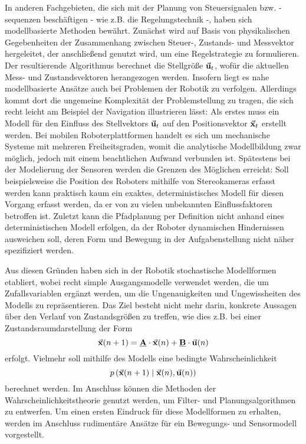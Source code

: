 In anderen Fachgebieten, die sich mit der Planung von Steuersignalen bzw. -sequenzen beschäftigen - wie z.B. die Regelungstechnik -, haben sich modellbasierte Methoden bewährt. Zunächst wird auf Basis von physikalischen Gegebenheiten der Zusammenhang zwischen Steuer-, Zustands- und Messvektor hergeleitet, der anschließend genutzt wird, um eine Regelstrategie zu formulieren. Der resultierende Algorithmus berechnet die Stellgröße $\vec{\mathbf{u}}_t$, wofür die aktuellen Mess- und Zustandsvektoren herangezogen werden. Insofern liegt es nahe modellbasierte Ansätze auch bei Problemen der Robotik zu verfolgen. Allerdings kommt dort die ungemeine Komplexität der Problemstellung zu tragen, die sich recht leicht am Beispiel der Navigation illustrieren lässt: Als erstes muss ein Modell für den Einfluss des Stellvektors $\vec{\mathbf{u}}_t$ auf den Positionsvektor $\vec{\mathbf{x}}_t$ erstellt werden. Bei mobilen Roboterplattformen handelt es sich um mechanische Systeme mit mehreren Freiheitsgraden, womit die analytische Modellbildung zwar möglich, jedoch mit einem beachtlichen Aufwand verbunden ist. Spätestens bei der Modelierung der Sensoren werden die Grenzen des Möglichen erreicht: Soll beispielsweise die Position des Roboters mithilfe von Stereokameras erfasst werden kann praktisch kaum ein exaktes, deterministisches Modell für diesen Vorgang erfasst werden, da er von zu vielen unbekannten Einflussfaktoren betroffen ist. Zuletzt kann die Pfadplanung per Definition nicht anhand eines deterministischen Modell erfolgen, da der Roboter dynamischen Hindernissen ausweichen soll, deren Form und Bewegung in der Aufgabenstellung nicht näher spezifiziert werden.

Aus diesen Gründen haben sich in der Robotik stochastische Modellformen etabliert, wobei recht simple Ausgangsmodelle verwendet werden, die um Zufallsvariablen ergänzt werden, um die Ungenauigkeiten und Ungewissheiten des Modells zu repräsentieren. Das Ziel besteht nicht mehr darin, konkrete Aussagen über den Verlauf von Zustandsgrößen zu treffen, wie dies z.B. bei einer Zustandsraumdarstellung der Form
\begin{equation}
\vec{\mathbf{x}}(n+1) = \mathbf{\underline{{{A}}}}\cdot \vec{\mathbf{x}}(n) + \mathbf{\underline{{B}}}\cdot \vec{\mathbf{\mathbf{u}}}(n)
\end{equation}
erfolgt. Vielmehr soll mithilfe des Modells eine bedingte Wahrscheinlichkeit
\begin{equation}
p\left({\vec{\mathbf{x}}(n+1)} \hspace{1mm} \vert \hspace{1mm} {\vec{\mathbf{x}}(n), \vec{\mathbf{u}}(n)}\right)
\end{equation}
berechnet werden. Im Anschluss können die Methoden der Wahrscheinlichkeitstheorie genutzt werden, um Filter- und Planungsalgorithmen zu entwerfen. Um einen ersten Eindruck für diese Modellformen zu erhalten, werden im Anschluss rudimentäre Ansätze für ein Bewegungs- und Sensormodell vorgestellt.


\newpage

\newpage

\newpage

